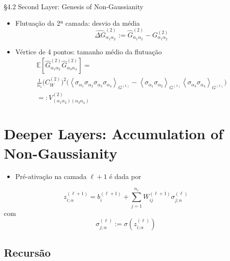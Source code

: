 \documentclass{beamer}
\newcommand{\EE}{\mathbb{E}}
\def\mi#1{{\alpha_{#1}}}
\def\eell{{(\ell)}}
\def\eellum{{(\ell+1)}}
\def\Gchapp#1{\widehat{G}^{(#1)}}
\newcommand{\Gchapeu}[3]{{\Gchapp{#1}_{\mi{#2}\mi{#3}}}}
\newcommand{\Gnormal}[3]{{G^{(#1)}_{\mi{#2}\mi{#3}}}}
\newcommand{\Gflutu}[3]{{\widehat{\Delta G}^{(#1)}_{\mi{#2}\mi{#3}}}}
\newcommand{\Vertice}[5]{V^{(#1)}_{(\mi#2\mi#3)(\mi#4\mi#5)}}
\newcommand{\Expectation}[2]{\left\langle #1 \right\rangle_{#2}}
\begin{document}
\begin{frame}{\S 4.2 Second Layer: Genesis of Non-Gaussianity}
\begin{itemize}
	\item Flutuação da 2ª camada: desvio da média
	\begin{equation*}\tag{4.38}
		\Gflutu212 := \Gchapeu212 - \Gnormal212
	\end{equation*}
	\item Vértice de 4 pontos: tamanho médio da flutuação
	\begin{multline*}
		\EE\left[\Gchapeu212\Gchapeu234\right]  = \\ \frac{1}{n_1}\big(C_W^{(2)}\big)^2\big(  \Expectation{\sigma_\mi1\sigma_\mi2\sigma_\mi3\sigma_\mi4}{G^{(1)}} -  \Expectation{\sigma_\mi1\sigma_\mi2 }{G^{(1)}}  \Expectation{\sigma_\mi3\sigma_\mi4}{G^{(1)}}\big) \\
		=: \Vertice21234 \tag{4.40}
	\end{multline*}
\end{itemize}
\end{frame}


\section{Deeper Layers: Accumulation of Non-Gaussianity}

\begin{frame}
\tableofcontents[currentsection]
\end{frame}

\begin{frame}
	\begin{itemize}
		\item Pré-ativação na camada $\ell+1$ é dada por
	\end{itemize}
	\begin{equation*}
		z_{i;\alpha}^\eellum = b_i^\eellum + \sum_{j=1}^{n_\ell} W_{ij}^\eellum\sigma_{j;\alpha}^\eell
	\end{equation*}
	com 
	$$\sigma_{j;\alpha}^\eell := \sigma\left(z_{i;\alpha}^\eell\right)$$
\end{frame}

\subsection{Recursão}
\end{document}
